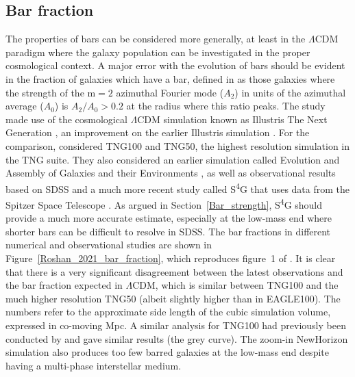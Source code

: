 \documentclass[fleqn,usenatbib,useAMS,onecolumn]{mnras} %
\begin{document}
\subsection{Bar fraction}
\label{Bar_fraction}

The properties of bars can be considered more generally, at least in the $\Lambda$CDM paradigm where the galaxy population can be investigated in the proper cosmological context. A major error with the evolution of bars should be evident in the fraction of galaxies which have a bar, defined in \citet{Roshan_2021_disc_stability} as those galaxies where the strength of the $\mathrm{m} = 2$ azimuthal Fourier mode ($A_2$) in units of the azimuthal average ($A_0$) is $A_2/A_0 > 0.2$ at the radius where this ratio peaks. The study made use of the cosmological $\Lambda$CDM simulation known as Illustris The Next Generation \citep[hereafter TNG;][]{Nelson_2019}, an improvement on the earlier Illustris simulation \citep{Vogelsberger_2014}. For the comparison, \citet{Roshan_2021_disc_stability} considered TNG100 and TNG50, the highest resolution simulation in the TNG suite. They also considered an earlier simulation called Evolution and Assembly of Galaxies and their Environments \citep[EAGLE;][]{Crain_2015, Schaye_2015}, as well as observational results based on SDSS \citep{Oh_2012} and a much more recent study called S\textsuperscript{4}G that uses data from the Spitzer Space Telescope \citep{Erwin_2018}. As argued in Section~\ref{Bar_strength}, S\textsuperscript{4}G should provide a much more accurate estimate, especially at the low-mass end where shorter bars can be difficult to resolve in SDSS. The bar fractions in different numerical and observational studies are shown in Figure~\ref{Roshan_2021_bar_fraction}, which reproduces figure~1 of \citet{Roshan_2021_bar_speed}. It is clear that there is a very significant disagreement between the latest observations and the bar fraction expected in $\Lambda$CDM, which is similar between TNG100 and the much higher resolution TNG50 (albeit slightly higher than in EAGLE100). The numbers refer to the approximate side length of the cubic simulation volume, expressed in co-moving Mpc. A similar analysis for TNG100 had previously been conducted by \citet{Zhao_2020} and gave similar results (the grey curve). The zoom-in NewHorizon simulation \citep{Dubois_2021} also produces too few barred galaxies at the low-mass end \citep{Reddish_2022} despite having a multi-phase interstellar medium.
\end{document}

